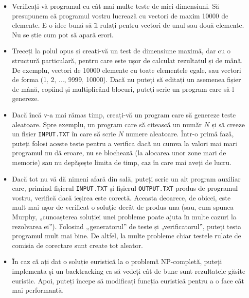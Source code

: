 \begin{itemize}

\item Verificați-vă programul cu cât mai multe teste de mici dimensiuni. Să
  presupunem că programul vostru lucrează cu vectori de maxim 10000 de
  elemente. E o idee bună să îl rulați pentru vectori de unul sau două
  elemente. Nu se știe cum pot să apară erori.

\item Treceți la polul opus și creați-vă un test de dimensiune maximă, dar cu
  o structură particulară, pentru care este ușor de calculat rezultatul și de
  mână. De exemplu, vectori de 10000 elemente cu toate elementele egale, sau
  vectori de forma (1, 2, ..., 9999, 10000). Dacă nu puteți să editați un
  asemenea fișier de mână, copiind și multiplicând blocuri, puteți scrie un
  program care să-l genereze.

\item Dacă încă v-a mai rămas timp, creați-vă un program care să genereze
  teste aleatoare. Spre exemplu, un program care să citească un număr $N$ și
  să creeze un fișier {\tt INPUT.TXT} în care să scrie $N$ numere
  aleatoare. Într-o primă fază, puteți folosi aceste teste pentru a verifica
  dacă nu cumva la valori mai mari programul nu dă eroare, nu se blochează (la
  alocarea unor zone mari de memorie) sau nu depășește limita de timp, caz în
  care mai aveți de lucru.
  
\item Dacă tot nu vă dă nimeni afară din sală, puteți scrie un alt program
  auxiliar care, primind fișierul {\tt INPUT.TXT} și fișierul {\tt OUTPUT.TXT}
  produs de programul vostru, verifică dacă ieșirea este corectă. Aceasta
  deoarece, de obicei, este mult mai ușor de verificat o soluție decât de
  produs una (sau, cum spunea Murphy, „cunoașterea soluției unei probleme
  poate ajuta în multe cazuri la rezolvarea ei”). Folosind „generatorul” de
  teste și „verificatorul”, puteți testa programul mult mai bine. De altfel,
  la multe probleme chiar testele rulate de comisia de corectare sunt create
  tot aleator.

\item În caz că ați dat o soluție euristică la o problemă NP-completă, puteți
  implementa și un backtracking ca să vedeți cât de bune sunt rezultatele
  găsite euristic. Apoi, puteți începe să modificați funcția euristică pentru
  a o face cât mai performantă.

\end{itemize}


